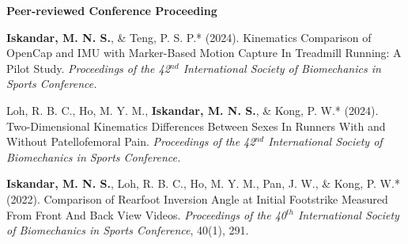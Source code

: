 \documentclass[../main.tex]{subfiles}
\begin{document}
        \textbf{Peer-reviewed Conference Proceeding}
        \def\labelprefix{C}
        \begin{etaremune}
            \item\label{conference: isbs2024opencap} {\textbf{Iskandar, M. N. S.}, \& Teng, P. S. P.* (2024). Kinematics Comparison of OpenCap and IMU with Marker-Based Motion Capture In Treadmill Running: A Pilot Study. \textit{Proceedings of the 42$^{nd}$ International Society of Biomechanics in Sports Conference.} \href{https://commons.nmu.edu/isbs/vol42/iss1/136/}{\faFilePdfO} \href{https://github.com/Shahril-Iskandar/publication-conference-validation}{\faGithub}}
        
            \item\label{conference: isbs2024raystudy} Loh, R. B. C., Ho, M. Y. M., {\textbf{Iskandar, M. N. S.}, \& Kong, P. W.* (2024). Two-Dimensional Kinematics Differences Between Sexes In Runners With and Without Patellofemoral Pain. \textit{Proceedings of the 42$^{nd}$ International Society of Biomechanics in Sports Conference.}} \href{https://commons.nmu.edu/isbs/vol42/iss1/124/}{\faFilePdfO}
            
            \item\label{conference: isbs2022} {\textbf{Iskandar, M. N. S.}, Loh, R. B. C., Ho, M. Y. M., Pan, J. W., \& Kong, P. W.* (2022). Comparison of Rearfoot Inversion Angle at Initial Footstrike Measured From Front And Back View Videos. \textit{Proceedings of the 40$^{th}$ International Society of Biomechanics in Sports Conference}, 40(1), 291. \href{https://commons.nmu.edu/isbs/vol40/iss1/70/}{\faFilePdfO}}
        \end{etaremune}
\end{document}

